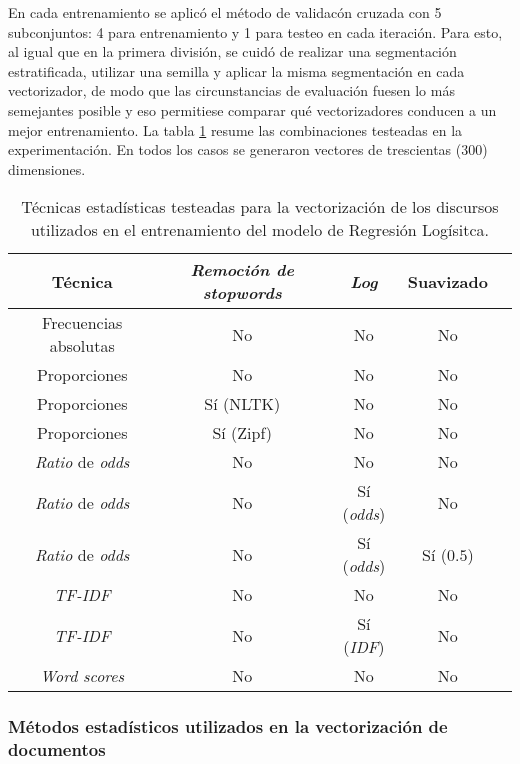 En cada entrenamiento se aplic\'o el m\'etodo
de validac\'on cruzada con 5 subconjuntos: 4 para entrenamiento y 1 para testeo
en cada iteraci\'on.
Para esto, al igual que en la primera divisi\'on, se cuid\'o de realizar
una segmentaci\'on estratificada, utilizar una semilla y
aplicar la misma segmentaci\'on en cada vectorizador,
de modo que las circunstancias de evaluaci\'on fuesen lo m\'as semejantes posible
y eso permitiese comparar qu\'e vectorizadores conducen a un mejor entrenamiento.
La tabla \ref{table-methods-vectorizers} resume las combinaciones testeadas
en la experimentaci\'on. En todos los casos se generaron vectores de trescientas
($300$) dimensiones.

\begin{table}[ht]
\centering
\begin{tabular}{ |c|c|c|c|c| }
    \hline
    T\'ecnica & \textit{Remoci\'on de stopwords} & \textit{Log} & Suavizado \\
    \hline\hline
    Frecuencias absolutas & No & No & No \\
    \hline
    Proporciones & No & No & No \\
    \hline
    Proporciones & S\'i (NLTK) & No & No \\
    \hline
    Proporciones & S\'i (Zipf) & No & No \\
    \hline
    \textit{Ratio} de \textit{odds} & No & No & No \\
    \hline
    \textit{Ratio} de \textit{odds} & No & S\'i (\textit{odds}) & No \\
    \hline
    \textit{Ratio} de \textit{odds} & No & S\'i (\textit{odds}) & S\'i ($0.5$) \\
    \hline
    \textit{TF-IDF} & No & No & No \\
    \hline
    \textit{TF-IDF} & No & S\'i (\textit{IDF}) & No \\
    \hline
    \textit{Word scores} & No & No & No \\
    \hline
\end{tabular}
\caption{T\'ecnicas estad\'isticas testeadas para la vectorizaci\'on de los
discursos utilizados en el entrenamiento del modelo de Regresi\'on Log\'isitca.}
\label{table-methods-vectorizers}
\end{table}

\subsubsection{M\'etodos estad\'isticos utilizados en la vectorizaci\'on de documentos}
\label{subsubsec-methods-vectorizers}

